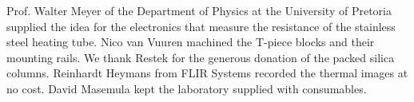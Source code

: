 \documentclass[aip,rsi,preprint,graphicx]{revtex4-1} %
\begin{document}
\begin{acknowledgments}

Prof. Walter Meyer of the Department of Physics at the University of Pretoria
supplied the idea for the electronics that measure the resistance of the
stainless steel heating tube. Nico van Vuuren machined the T-piece blocks and
their mounting rails. We thank Restek for the generous donation of the packed
silica columns. Reinhardt Heymans from FLIR Systems recorded the thermal images
at no cost. David Masemula kept the laboratory supplied with consumables.

\end{acknowledgments}


\end{document}
